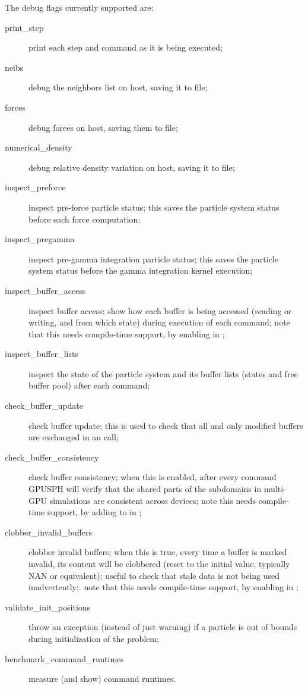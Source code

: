 \documentclass{../GPUSPHtemplate}
\begin{document}
The debug flags currently supported are:
\begin{description}
\item[print_step] print each step and command as it is being executed;
\item[neibs] debug the neighbors list on host, saving it to file;
\item[forces] debug forces on host, saving them to file;
\item[numerical_density] debug relative density variation on host, saving it to
file;
\item[inspect_preforce] inspect pre-force particle status; this saves
the particle system status before each force computation;
\item[inspect_pregamma] inspect pre-gamma integration particle status;
this saves the particle system status before the gamma integration
kernel execution;
\item[inspect_buffer_access] inspect buffer access; show how each buffer
is being accessed (reading or writing, and from which state) during
execution of each command; note that this needs compile-time support,
by enabling  in ;
\item[inspect_buffer_lists] inspect the state of the particle system and
its buffer lists (states and free buffer pool) after each command;
\item[check_buffer_update] check buffer update; this is used to check
that all and only modified buffers are exchanged in an
 call;
\item[check_buffer_consistency] check buffer consistency;
when this is enabled, after every command GPUSPH will verify
that the shared parts of the subdomains in multi-GPU simulations
are consistent across devices; note this needs compile-time support,
by adding  to  in
;
\item[clobber_invalid_buffers] clobber invalid buffers;
when this is true, every time a buffer is marked invalid,
its content will be clobbered (reset to the initial value,
typically NAN or equivalent); useful to check that stale data is not
being used inadvertently;. note that this needs compile-time support,
by enabling  in ;
\item[validate_init_positions] throw an exception (instead of just
warning) if a particle is out of bounds during initialization of the
problem;
\item[benchmark_command_runtimes] measure (and show) command runtimes.
\end{description}
\end{document}
